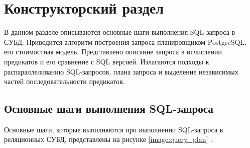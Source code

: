 \chapter{Конструкторский раздел}
В данном разделе описываются основные шаги выполнения SQL-запроса в СУБД. Приводится алгоритм построения запроса планировщиком PostgreSQL, его стоимостная модель. Представлено описание запроса в исчислении предикатов и его сравнение с SQL версией. Излагаются подходы к распараллеливанию SQL-запросов, плана запроса и выделение независимых частей последовательности предикатов.

\section{Основные шаги выполнения SQL-запроса}
\vspace{-0.5cm}
Основные шаги, которые выполняются при выполнении SQL-запроса в реляционных СУБД, представлены на рисунке \ref{image:query_plan} \cite{stages_sql_query}.

\begin{figure}[H]
	\captionsetup{justification=centering}
\end{figure}

